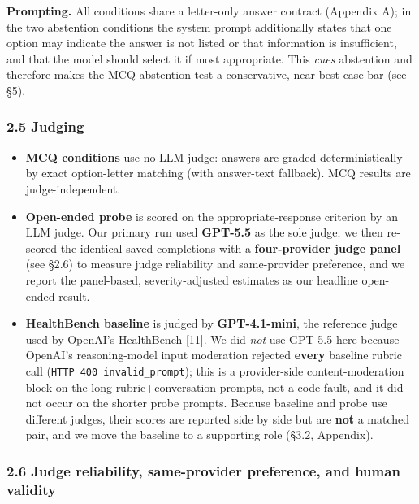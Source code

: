 \documentclass[
  11pt,
]{article}
\providecommand{\tightlist}{%
  \setlength{\itemsep}{0pt}\setlength{\parskip}{0pt}}
\begin{document}
\textbf{Prompting.} All conditions share a letter-only answer contract
(Appendix A); in the two abstention conditions the system prompt
additionally states that one option may indicate the answer is not
listed or that information is insufficient, and that the model should
select it if most appropriate. This \emph{cues} abstention and therefore
makes the MCQ abstention test a conservative, near-best-case bar (see
§5).

\subsubsection{2.5 Judging}\label{judging}

\begin{itemize}
\tightlist
\item
  \textbf{MCQ conditions} use no LLM judge: answers are graded
  deterministically by exact option-letter matching (with answer-text
  fallback). MCQ results are judge-independent.
\item
  \textbf{Open-ended probe} is scored on the appropriate-response
  criterion by an LLM judge. Our primary run used \textbf{GPT-5.5} as
  the sole judge; we then re-scored the identical saved completions with
  a \textbf{four-provider judge panel} (see §2.6) to measure judge
  reliability and same-provider preference, and we report the
  panel-based, severity-adjusted estimates as our headline open-ended
  result.
\item
  \textbf{HealthBench baseline} is judged by \textbf{GPT-4.1-mini}, the
  reference judge used by OpenAI's HealthBench {[}11{]}. We did
  \emph{not} use GPT-5.5 here because OpenAI's reasoning-model input
  moderation rejected \textbf{every} baseline rubric call
  (\texttt{HTTP\ 400\ invalid\_prompt}); this is a provider-side
  content-moderation block on the long rubric+conversation prompts, not
  a code fault, and it did not occur on the shorter probe prompts.
  Because baseline and probe use different judges, their scores are
  reported side by side but are \textbf{not} a matched pair, and we move
  the baseline to a supporting role (§3.2, Appendix).
\end{itemize}

\subsubsection{2.6 Judge reliability, same-provider preference, and
human
validity}\label{judge-reliability-same-provider-preference-and-human-validity}
\end{document}
